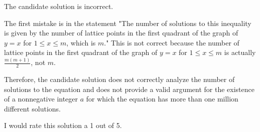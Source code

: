 The candidate solution is incorrect.

The first mistake is in the statement "The number of solutions to this inequality is given by the number of lattice points in the first quadrant of the graph of \( y = x \) for \( 1 \leq x \leq m \), which is \( m \)." This is not correct because the number of lattice points in the first quadrant of the graph of \( y = x \) for \( 1 \leq x \leq m \) is actually \( \frac{m(m+1)}{2} \), not \( m \).

Therefore, the candidate solution does not correctly analyze the number of solutions to the equation and does not provide a valid argument for the existence of a nonnegative integer \( a \) for which the equation has more than one million different solutions.

I would rate this solution a 1 out of 5.
